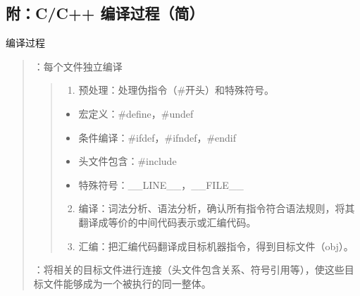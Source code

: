 \documentclass[letterpaper,10pt,english]{sphinxmanual}
\begin{document}
\begin{sphinxVerbatim}[commandchars=\\\{\},numbers=left,firstnumber=1,stepnumber=1]
      
     

    

   
\end{sphinxVerbatim}


\subsection{附：C/C++ 编译过程（简）}
\label{\detokenize{cpp/20_define:c-c}}
编译过程
\begin{quote}

 ：每个文件独立编译
\begin{quote}
\begin{enumerate}
\item {} 
预处理：处理伪指令（\#开头）和特殊符号。

\end{enumerate}
\begin{itemize}
\item {} 
宏定义：\#define，\#undef

\item {} 
条件编译：\#ifdef，\#ifndef，\#endif

\item {} 
头文件包含：\#include

\item {} 
特殊符号：\_\_LINE\_\_，\_\_FILE\_\_

\end{itemize}
\begin{enumerate}
\setcounter{enumi}{1}
\item {} 
编译：词法分析、语法分析，确认所有指令符合语法规则，将其翻译成等价的中间代码表示或汇编代码。

\item {} 
汇编：把汇编代码翻译成目标机器指令，得到目标文件（obj）。

\end{enumerate}
\end{quote}

 ：将相关的目标文件进行连接（头文件包含关系、符号引用等），使这些目标文件能够成为一个被执行的同一整体。
\end{quote}
\end{document}
